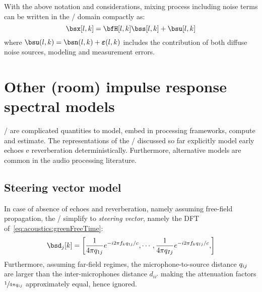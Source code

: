 With the above notation and considerations, mixing process including noise terms can be written in the \STFT/ domain compactly as:
\begin{equation}\label{eq:processing:model:stfs}
    \bsx[l,k] = \bfH[l,k] \bss[l,k] + \bsu[l,k]
\end{equation}
where $\bsu(l,k) = \bsn(l,k) + \boldsymbol{\varepsilon}(l,k)$ includes the contribution of both diffuse noise sources, modeling and measurement errors.



\section{Other (room) impulse response spectral models}
\RIRs/ are complicated quantities to model, embed in processing frameworks, compute and estimate.
The representations of the \RIR/ discussed so far explicitly model early echoes e reverberation deterministically.
Furthermore, alternative models are common in the audio processing literature.

\subsection{Steering vector model}
In case of absence of echoes and reverberation, namely assuming free-field propagation,
the \RIRs/ simplify to \textit{steering vector}, namely the DFT of~\cref{eq:acoustics:greenFreeTime}:
\begin{equation}\label{eq:processing:steering}
    \bsd_{j}[k] = \klist{\frac{1}{4 \pi \distMicSrc_{1j}} \cste^{-\csti 2 \pi f_k \distMicSrc_{1j} / c},
                            \cdots,
                            \frac{1}{4 \pi \distMicSrc_{Ij}} \cste^{-\csti 2 \pi f_k \distMicSrc_{Ij} / c},
                    }
\end{equation}
Furthermore, assuming far-field regimes, the microphone-to-source distance $q_{ij}$ are larger than the
inter-microphones distance $d_{ii'}$ making the attenuation factors $\sfrac{1}{4 \pi q_{ij}}$ approximately equal, hence ignored.


